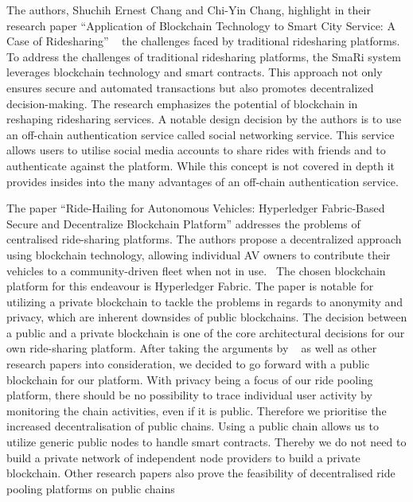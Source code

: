 The authors, Shuchih Ernest Chang and Chi-Yin Chang, highlight in their research paper ``Application of Blockchain Technology to Smart City Service: A Case of Ridesharing'' ~\cite{Chang.} the challenges faced by traditional ridesharing platforms. To address the challenges of traditional ridesharing platforms, the SmaRi system leverages blockchain technology and smart contracts. This approach not only ensures secure and automated transactions but also promotes decentralized decision-making. The research emphasizes the potential of blockchain in reshaping ridesharing services. A notable design decision by the authors is to use an off-chain authentication service called social networking service. This service allows users to utilise social media accounts to share rides with friends and to authenticate against the platform. While this concept is not covered in depth it provides insides into the many advantages of an off-chain authentication service.

The paper ``Ride-Hailing for Autonomous Vehicles: Hyperledger Fabric-Based Secure and Decentralize Blockchain Platform'' addresses the problems of centralised ride-sharing platforms. The authors propose a decentralized approach using blockchain technology, allowing individual AV owners to contribute their vehicles to a community-driven fleet when not in use.~\cite{Shivers.} The chosen blockchain platform for this endeavour is Hyperledger Fabric. The paper is notable for utilizing a private blockchain to tackle the problems in regards to anonymity and privacy, which are inherent downsides of public blockchains. The decision between a public and a private blockchain is one of the core architectural decisions for our own ride-sharing platform.  After taking the arguments by ~\cite{Shivers.} as well as other research papers into consideration, we decided to go forward with a public blockchain for our platform. With privacy being a focus of our ride pooling platform, there should be no possibility to trace individual user activity by monitoring the chain activities, even if it is public. Therefore we prioritise the increased decentralisation of public chains. Using a public chain allows us to utilize generic public nodes to handle smart contracts. Thereby we do not need to build a private network of independent node providers to build a private blockchain. Other research papers also prove the feasibility of decentralised ride pooling platforms on public chains ~\cite{Mahmoud.2022} ~\cite{Joseph.} ~\cite{Baza.52520205282020}

